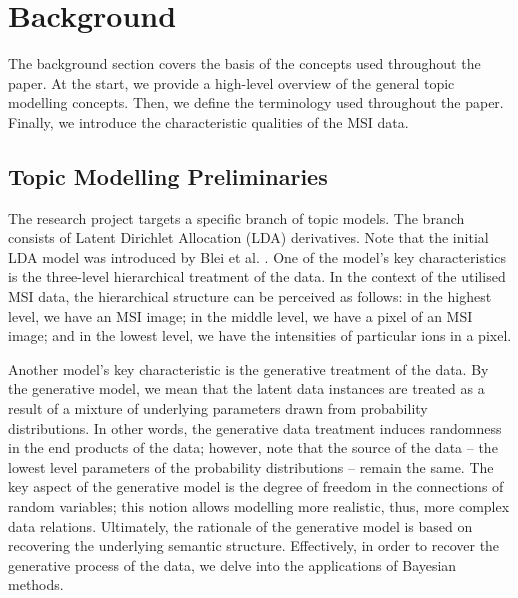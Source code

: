 \documentclass{mpaper}
\begin{document}
\section{Background}

\par The background section covers the basis of the concepts used throughout the paper. At the start, we provide a high-level overview of the general topic modelling concepts. Then, we define the terminology used throughout the paper. Finally, we introduce the characteristic qualities of the MSI data.  

\subsection{Topic Modelling Preliminaries}

\par The research project targets a specific branch of topic models. The branch consists of Latent Dirichlet Allocation (LDA) derivatives. Note that the initial LDA model was introduced by Blei et al. \cite{blei2003latent}. One of the model's key characteristics is the three-level hierarchical treatment of the data. In the context of the utilised MSI data, the hierarchical structure can be perceived as follows: in the highest level, we have an MSI image; in the middle level, we have a pixel of an MSI image; and in the lowest level, we have the intensities of particular ions in a pixel.

\par Another model's key characteristic is the generative treatment of the data. By the generative model, we mean that the latent data instances are treated as a result of a mixture of underlying parameters drawn from probability distributions. In other words, the generative data treatment induces randomness in the end products of the data; however, note that the source of the data -- the lowest level parameters of the probability distributions -- remain the same. The key aspect of the generative model is the degree of freedom in the connections of random variables; this notion allows modelling more realistic, thus, more complex data relations. Ultimately, the rationale of the generative model is based on recovering the underlying semantic structure. Effectively, in order to recover the generative process of the data, we delve into the applications of Bayesian methods.
\end{document}
